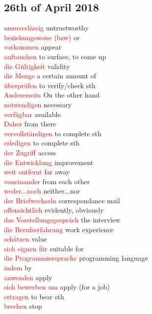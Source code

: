 \documentclass{article}
\begin{document}
\begin{multicols}{2}
	\section*{26th of April 2018}
	\textcolor{red}{unzuverlässig} untrustworthy\\
	\textcolor{red}{beziehungsweise (bzw)} or\\
	\textcolor{red}{vorkommen} appear\\
	\textcolor{red}{auftauchen} to surface, to come up\\
	\textcolor{red}{die Gültigkeit} validity\\
	\textcolor{red}{die Menge} a certain amount of \\
	\textcolor{red}{überprüfen} to verify/check sth\\
	\textcolor{red}{Andererseits} On the other hand\\
	\textcolor{red}{notwendigen} necessary\\
	\textcolor{red}{verfügbar} available\\
	\textcolor{red}{Daher} from there\\
	\textcolor{red}{vervollständigen} to complete sth\\
	\textcolor{red}{erledigen} to complete sth \\
	\textcolor{red}{der Zugriff} access\\
	\textcolor{red}{die Entwicklung} improvement\\
	\textcolor{red}{weit entfernt} far away\\
	\textcolor{red}{voneinander} from each other\\
	\textcolor{red}{weder...noch} neither...nor\\
	\textcolor{red}{der Briefwechseln} correspondance mail\\
	\textcolor{red}{offensichtlich} evidently, obviously\\
	\textcolor{red}{das Vorstellungsgespräch} the interview\\
	\textcolor{red}{die Berufserfahrung} work experience\\
	\textcolor{red}{schätzen} value\\
	\textcolor{red}{sich eignen für} suitable for\\
	\textcolor{red}{die Programmiersprache} programming language\\
	\textcolor{red}{indem}  by \\
	\textcolor{red}{anwenden} apply\\
	\textcolor{red}{sich bewerben um} apply (for a job)\\
	\textcolor{red}{ertragen} to bear sth\\
	\textcolor{red}{brechen} stop\\
	
	
	

	
	
	
	
	
	\end{multicols}

	\printglossaries
	
\end{document}
